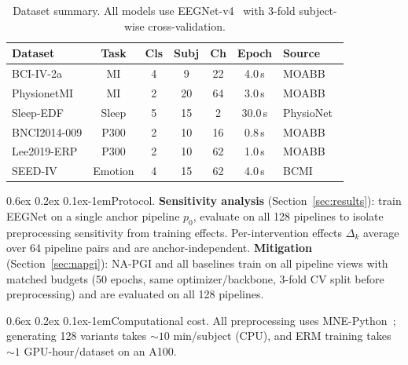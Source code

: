 \documentclass{article}
\makeatletter
\renewcommand{\paragraph}{\@startsection{paragraph}{4}{\z@}%
  {0.6ex \@plus 0.2ex \@minus 0.1ex}{-1em}{\normalsize\bf}}
\makeatother
\begin{document}
\begin{table}[h]
\centering
\caption{Dataset summary. All models use EEGNet-v4~\citep{lawhern2018eegnet} with 3-fold subject-wise cross-validation.}
\label{tab:datasets}
\footnotesize
\begin{tabular}{@{}lcccccl@{}}
\toprule
Dataset & Task & Cls & Subj & Ch & Epoch & Source \\
\midrule
BCI-IV-2a~\citep{brunner2008bci} & MI & 4 & 9 & 22 & 4.0\,s & MOABB~\citep{jayaram2018moabb} \\
PhysionetMI~\citep{schalk2004bci2000} & MI & 2 & 20 & 64 & 3.0\,s & MOABB~\citep{jayaram2018moabb} \\
Sleep-EDF~\citep{kemp2000analysis} & Sleep & 5 & 15 & 2 & 30.0\,s & PhysioNet~\citep{goldberger2000physiobank} \\
BNCI2014-009 & P300 & 2 & 10 & 16 & 0.8\,s & MOABB~\citep{jayaram2018moabb} \\
Lee2019-ERP & P300 & 2 & 10 & 62 & 1.0\,s & MOABB~\citep{jayaram2018moabb} \\
SEED-IV & Emotion & 4 & 15 & 62 & 4.0\,s & BCMI~\citep{zheng2019emotionmeter} \\
\bottomrule
\end{tabular}
\end{table}

\paragraph{Protocol.}
\textbf{Sensitivity analysis} (Section~\ref{sec:results}): train EEGNet on a single anchor pipeline $p_0$, evaluate on all 128 pipelines to isolate preprocessing sensitivity from training effects. Per-intervention effects $\Delta_k$ average over 64 pipeline pairs and are anchor-independent. \textbf{Mitigation} (Section~\ref{sec:napgi}): NA-PGI and all baselines train on all pipeline views with matched budgets (50 epochs, same optimizer/backbone, 3-fold CV split before preprocessing) and are evaluated on all 128 pipelines.

\paragraph{Computational cost.}
All preprocessing uses MNE-Python~\citep{gramfort2013mne}; generating 128 variants takes ${\sim}10$ min/subject (CPU), and ERM training takes ${\sim}1$ GPU-hour/dataset on an A100.

\end{document}
